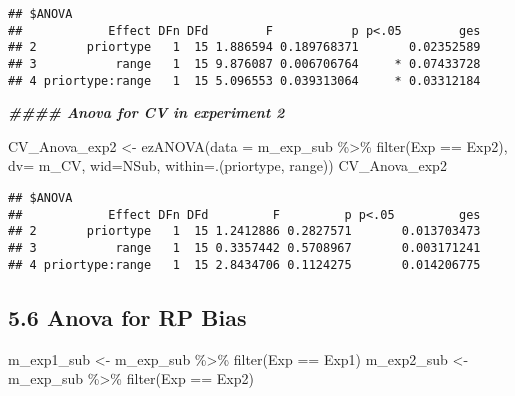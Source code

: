 \documentclass[
]{article}
\newenvironment{Shaded}{\begin{snugshade}}{\end{snugshade}}
\newcommand{\AttributeTok}[1]{\textcolor[rgb]{0.77,0.63,0.00}{#1}}
\newcommand{\DocumentationTok}[1]{\textcolor[rgb]{0.56,0.35,0.01}{\textbf{\textit{#1}}}}
\newcommand{\FunctionTok}[1]{\textcolor[rgb]{0.00,0.00,0.00}{#1}}
\newcommand{\NormalTok}[1]{#1}
\newcommand{\OtherTok}[1]{\textcolor[rgb]{0.56,0.35,0.01}{#1}}
\newcommand{\SpecialCharTok}[1]{\textcolor[rgb]{0.00,0.00,0.00}{#1}}
\newcommand{\StringTok}[1]{\textcolor[rgb]{0.31,0.60,0.02}{#1}}
\begin{document}
\begin{verbatim}
## $ANOVA
##            Effect DFn DFd        F           p p<.05        ges
## 2       priortype   1  15 1.886594 0.189768371       0.02352589
## 3           range   1  15 9.876087 0.006706764     * 0.07433728
## 4 priortype:range   1  15 5.096553 0.039313064     * 0.03312184
\end{verbatim}

\begin{Shaded}
\begin{Highlighting}[]
\DocumentationTok{\#\#\#\# Anova for CV in experiment 2}

\NormalTok{CV\_Anova\_exp2 }\OtherTok{\textless{}{-}} \FunctionTok{ezANOVA}\NormalTok{(}\AttributeTok{data =}\NormalTok{ m\_exp\_sub }\SpecialCharTok{\%\textgreater{}\%} \FunctionTok{filter}\NormalTok{(Exp }\SpecialCharTok{==} \StringTok{\textquotesingle{}Exp2\textquotesingle{}}\NormalTok{), }\AttributeTok{dv=}\NormalTok{ m\_CV, }\AttributeTok{wid=}\NormalTok{NSub, }\AttributeTok{within=}\NormalTok{.(priortype, range))}
\NormalTok{CV\_Anova\_exp2}
\end{Highlighting}
\end{Shaded}

\begin{verbatim}
## $ANOVA
##            Effect DFn DFd         F         p p<.05         ges
## 2       priortype   1  15 1.2412886 0.2827571       0.013703473
## 3           range   1  15 0.3357442 0.5708967       0.003171241
## 4 priortype:range   1  15 2.8434706 0.1124275       0.014206775
\end{verbatim}

\hypertarget{anova-for-rp-bias}{%
\subsection{5.6 Anova for RP Bias}\label{anova-for-rp-bias}}

\begin{Shaded}
\begin{Highlighting}[]
\NormalTok{m\_exp1\_sub }\OtherTok{\textless{}{-}}\NormalTok{ m\_exp\_sub }\SpecialCharTok{\%\textgreater{}\%} \FunctionTok{filter}\NormalTok{(Exp }\SpecialCharTok{==} \StringTok{\textquotesingle{}Exp1\textquotesingle{}}\NormalTok{)}
\NormalTok{m\_exp2\_sub }\OtherTok{\textless{}{-}}\NormalTok{ m\_exp\_sub }\SpecialCharTok{\%\textgreater{}\%} \FunctionTok{filter}\NormalTok{(Exp }\SpecialCharTok{==} \StringTok{\textquotesingle{}Exp2\textquotesingle{}}\NormalTok{)}
\end{Highlighting}
\end{Shaded}
\end{document}
